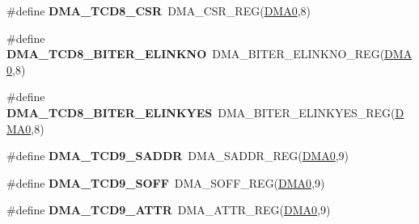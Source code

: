 \begin{DoxyCompactItemize}
\item 
\#define {\bfseries D\+M\+A\+\_\+\+T\+C\+D8\+\_\+\+C\+SR}~D\+M\+A\+\_\+\+C\+S\+R\+\_\+\+R\+EG(\hyperlink{group__DMA__Peripheral__Access__Layer_ga4103044f9ca209772f513dc694513ffb}{D\+M\+A0},8)\hypertarget{group__DMA__Register__Accessor__Macros_ga803ebab170f7e3a1979cb7e9a58d3f1c}{}\label{group__DMA__Register__Accessor__Macros_ga803ebab170f7e3a1979cb7e9a58d3f1c}

\item 
\#define {\bfseries D\+M\+A\+\_\+\+T\+C\+D8\+\_\+\+B\+I\+T\+E\+R\+\_\+\+E\+L\+I\+N\+K\+NO}~D\+M\+A\+\_\+\+B\+I\+T\+E\+R\+\_\+\+E\+L\+I\+N\+K\+N\+O\+\_\+\+R\+EG(\hyperlink{group__DMA__Peripheral__Access__Layer_ga4103044f9ca209772f513dc694513ffb}{D\+M\+A0},8)\hypertarget{group__DMA__Register__Accessor__Macros_ga4d20f91416d78e491c9f030b53cc7bcf}{}\label{group__DMA__Register__Accessor__Macros_ga4d20f91416d78e491c9f030b53cc7bcf}

\item 
\#define {\bfseries D\+M\+A\+\_\+\+T\+C\+D8\+\_\+\+B\+I\+T\+E\+R\+\_\+\+E\+L\+I\+N\+K\+Y\+ES}~D\+M\+A\+\_\+\+B\+I\+T\+E\+R\+\_\+\+E\+L\+I\+N\+K\+Y\+E\+S\+\_\+\+R\+EG(\hyperlink{group__DMA__Peripheral__Access__Layer_ga4103044f9ca209772f513dc694513ffb}{D\+M\+A0},8)\hypertarget{group__DMA__Register__Accessor__Macros_gad040442b5582baa8e415dd881c0ad939}{}\label{group__DMA__Register__Accessor__Macros_gad040442b5582baa8e415dd881c0ad939}

\item 
\#define {\bfseries D\+M\+A\+\_\+\+T\+C\+D9\+\_\+\+S\+A\+D\+DR}~D\+M\+A\+\_\+\+S\+A\+D\+D\+R\+\_\+\+R\+EG(\hyperlink{group__DMA__Peripheral__Access__Layer_ga4103044f9ca209772f513dc694513ffb}{D\+M\+A0},9)\hypertarget{group__DMA__Register__Accessor__Macros_gabfaa87b6ce7fcca896ef0bea621484b0}{}\label{group__DMA__Register__Accessor__Macros_gabfaa87b6ce7fcca896ef0bea621484b0}

\item 
\#define {\bfseries D\+M\+A\+\_\+\+T\+C\+D9\+\_\+\+S\+O\+FF}~D\+M\+A\+\_\+\+S\+O\+F\+F\+\_\+\+R\+EG(\hyperlink{group__DMA__Peripheral__Access__Layer_ga4103044f9ca209772f513dc694513ffb}{D\+M\+A0},9)\hypertarget{group__DMA__Register__Accessor__Macros_ga9fa3ee648910ce0b3f958f9fba8109bd}{}\label{group__DMA__Register__Accessor__Macros_ga9fa3ee648910ce0b3f958f9fba8109bd}

\item 
\#define {\bfseries D\+M\+A\+\_\+\+T\+C\+D9\+\_\+\+A\+T\+TR}~D\+M\+A\+\_\+\+A\+T\+T\+R\+\_\+\+R\+EG(\hyperlink{group__DMA__Peripheral__Access__Layer_ga4103044f9ca209772f513dc694513ffb}{D\+M\+A0},9)\hypertarget{group__DMA__Register__Accessor__Macros_gab5bfe174e41a010fa81140945c342ef9}{}\label{group__DMA__Register__Accessor__Macros_gab5bfe174e41a010fa81140945c342ef9}


\end{DoxyCompactItemize}
